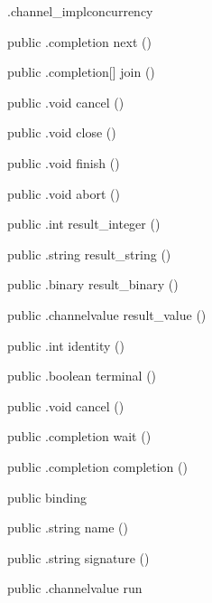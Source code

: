 \begin{CrexxClass}{.channel\_impl}{concurrency}
\begin{Members}
    \Method
      {public}
      {.completion}
      {next}
      {()}

    \Method
      {public}
      {.completion[]}
      {join}
      {()}

    \Method
      {public}
      {.void}
      {cancel}
      {()}

    \Method
      {public}
      {.void}
      {close}
      {()}

    \Method
      {public}
      {.void}
      {finish}
      {()}

    \Method
      {public}
      {.void}
      {abort}
      {()}

    \Method
      {public}
      {.int}
      {result\_integer}
      {()}

    \Method
      {public}
      {.string}
      {result\_string}
      {()}

    \Method
      {public}
      {.binary}
      {result\_binary}
      {()}

    \Method
      {public}
      {.channelvalue}
      {result\_value}
      {()}

    \Method
      {public}
      {.int}
      {identity}
      {()}

    \Method
      {public}
      {.boolean}
      {terminal}
      {()}

    \Method
      {public}
      {.void}
      {cancel}
      {()}

    \Method
      {public}
      {.completion}
      {wait}
      {()}

    \Method
      {public}
      {.completion}
      {completion}
      {()}

    \Factory
      {public}
      {binding}
      {}

    \Method
      {public}
      {.string}
      {name}
      {()}

    \Method
      {public}
      {.string}
      {signature}
      {()}

    \Method
      {public}
      {.channelvalue}
      {run}
      {}


\end{Members}
\end{CrexxClass}
